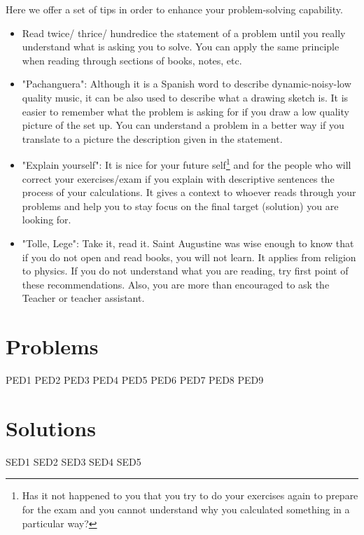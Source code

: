 \documentclass[a4paper,12pt]{article}
\numberwithin{equation}{subsection}
\begin{document}
Here we offer a set of tips in order to enhance your problem-solving capability.

\begin{itemize}
	\item Read twice/ thrice/ hundredice the statement of a problem until you really understand what is asking you to solve. You can apply the same principle when reading through sections of books, notes, etc.
	
	\item "Pachanguera": Although it is a Spanish word to describe dynamic-noisy-low quality music, it can be also used to describe what a drawing sketch is. It is easier to remember what the problem is asking for if you draw a low quality picture of the set up. You can understand a problem in a better way if you translate to a picture the description given in the statement.
	
	\item "Explain yourself": It is nice for your future self\footnote{Has it not happened to you that you try to do your exercises again to prepare for the exam and you cannot understand why you calculated something in a particular way?} and for the people who will correct your exercises/exam if you explain with descriptive sentences the process of your calculations. It gives a context to whoever reads through your problems and help you to stay focus on the final target (solution) you are looking for.
	
	\item "Tolle, Lege": Take it, read it. Saint Augustine was wise enough to know that if you do not open and read books, you will not learn. It applies from religion to physics. If you do not understand what you are reading, try first point of these recommendations. Also, you are more than encouraged to ask the Teacher or teacher assistant.
\end{itemize}

\newpage

\section{Problems}
{PED1}
{PED2}
{PED3}
{PED4}
{PED5}
{PED6}
{PED7}
{PED8}
{PED9}

\section{Solutions}
{SED1}
{SED2}
{SED3}
{SED4}
{SED5}
\end{document}
